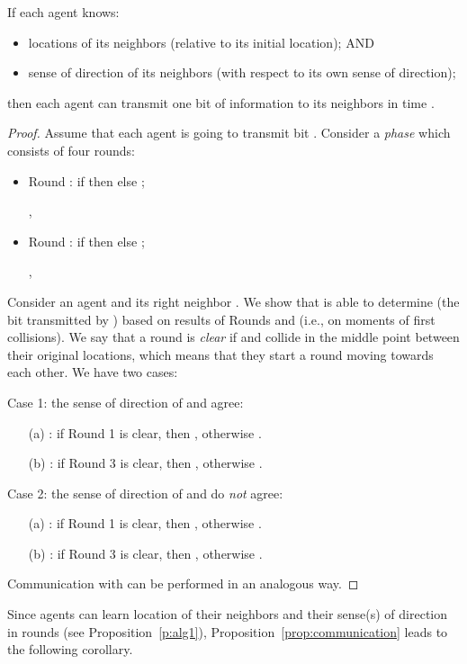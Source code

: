 \begin{proposition}\label{prop:communication}
If each agent knows:
\begin{itemize}
\item
\vspace{-5pt}
locations of its neighbors (relative to its initial location); AND
\item
\vspace{-5pt}
sense of direction of its neighbors (with respect to its own sense of direction);
\end{itemize}
then each agent can transmit one bit of information
to its neighbors in time .
\end{proposition}
\iffull
\begin{proof}
Assume that each agent  is going to transmit bit . Consider a {\em phase}
which consists of four rounds:
\begin{itemize}
\item Round : if  then  else ;

\SingleRound, \ReversedRound

\item Round : if  then  else ;

\SingleRound, \ReversedRound
\end{itemize}
Consider an agent  and its right neighbor . We show that  is able
to determine  (the bit transmitted by ) based on results of Rounds  and  (i.e., on moments of first
collisions). We say that a round is {\em clear} if  and  collide in the middle point
between their original locations, which means that they start a round moving towards
each other.
We have two cases:

\noindent Case 1: the sense of direction of  and  agree:
 \begin{enumerate}
 \item[(a)]
 : if Round 1 is clear, then , otherwise .
 \item[(b)]
 : if Round 3 is clear, then , otherwise .
 \end{enumerate}

\noindent Case 2: the sense of direction of  and  do {\em not} agree:
 \begin{enumerate}
 \item[(a)]
 : if Round 1 is clear, then , otherwise .
 \item[(b)]
 : if Round 3 is clear, then , otherwise .
 \end{enumerate}

Communication with  can be performed in an analogous way.

\end{proof}
\else
{}
\fi
Since agents can learn location of their neighbors and their sense(s) of direction
in  rounds (see Proposition~\ref{p:alg1}), Proposition~\ref{prop:communication}
leads to the following corollary.

